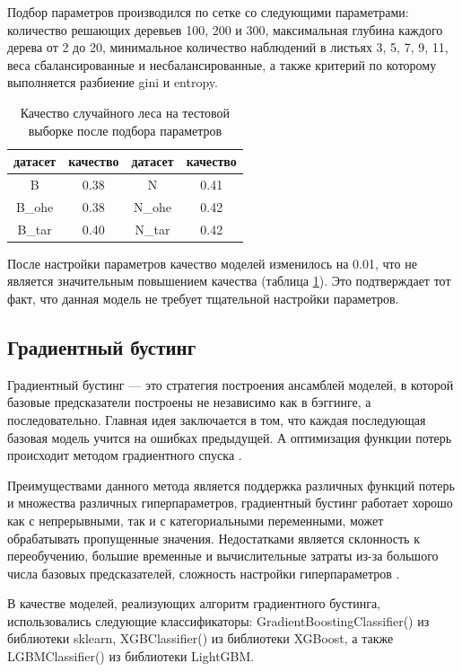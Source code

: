 \documentclass[14pt]{mmcs_article}
\begin{document}
Подбор параметров производился по сетке со следующими параметрами: количество решающих деревьев 100, 200 и 300, максимальная глубина каждого дерева от 2 до 20, минимальное количество наблюдений в листьях 3, 5, 7, 9, 11, веса сбалансированные и несбалансированные, а также критерий по которому выполняется разбиение gini и entropy.

\begin{table}[H]
	\centering
	\caption{Качество случайного леса на тестовой выборке после подбора параметров}\label{models:table6}
	\begin{tabular}{cccc}
		\hline
		датасет & качество	& датасет & качество \\
		\hline
		B &	0.38 &	N &	0.41 \\
		B\_ohe & 0.38 &	N\_ohe & 0.42\\
		B\_tar & 0.40 & N\_tar & 0.42 \\
		\hline
	\end{tabular}
\end{table}

После настройки параметров качество моделей изменилось на 0.01, что не является значительным повышением качества (таблица \ref{models:table6}). Это подтверждает тот факт, что данная модель не требует тщательной настройки параметров.

\subsection{Градиентный бустинг}

Градиентный бустинг --- это стратегия построения ансамблей моделей, в которой базовые предсказатели построены не независимо как в бэггинге, а последовательно. Главная идея заключается в том, что каждая последующая базовая модель учится на ошибках предыдущей. А оптимизация функции потерь происходит методом градиентного спуска \cite{lib:gradboost}.

Преимуществами данного метода является поддержка различных функций потерь и множества различных гиперпараметров, градиентный бустинг работает хорошо как с непрерывными, так и с категориальными переменными, может обрабатывать пропущенные значения. Недостатками является склонность к переобучению, большие временные и вычислительные затраты из-за большого числа базовых предсказателей, сложность настройки гиперпараметров \cite{lib:gradboost2}.

В качестве моделей, реализующих алгоритм градиентного бустинга, использовались следующие классификаторы: GradientBoostingClassifier() из библиотеки sklearn, XGBClassifier() из библиотеки XGBoost, а также LGBMClassifier() из библиотеки LightGBM.
\end{document}

